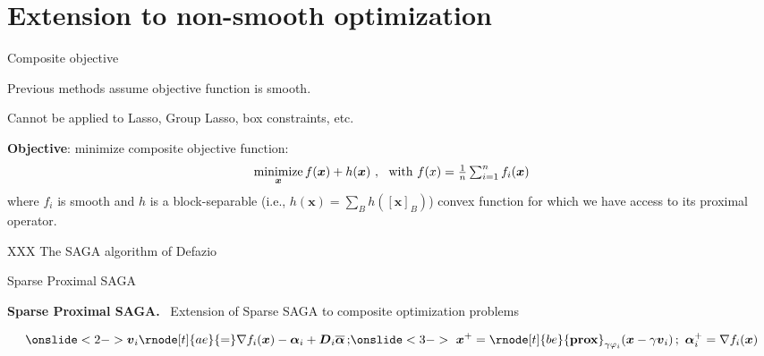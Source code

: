\documentclass[10pt]{beamer}
\let\oldparencite=\parencite
\renewcommand{\parencite}[1]{\textcolor[rgb]{1.,.9,.9}{\oldparencite{#1}}}
\begin{document}
\section{Extension to non-smooth optimization}



\begin{frame}{Composite objective}

Previous methods assume objective function is smooth.

Cannot be applied to Lasso, Group Lasso, box constraints, etc.


\vspace{5mm}
{\bfseries Objective}: minimize composite objective function:
$$
\operatorname*{minimize}_{{\boldsymbol x}} f({\boldsymbol x}) + h({\boldsymbol x})~,~ \text{ with $f(x) = \textstyle \frac{1}{n}\sum_{i=1}^n f_i({\boldsymbol x})$}
$$
where $f_i$ is smooth and $h$ is a block-separable (i.e., $h(\boldsymbol{x}) = \sum_{B} h([\boldsymbol{x}]_B)$) convex function for which we have access to its proximal operator.


XXX The SAGA algorithm of Defazio
\end{frame}



\begin{frame}{Sparse Proximal SAGA}

{\bfseries Sparse Proximal SAGA.}~\parencite{pedregosa2017proxasaga} Extension of Sparse SAGA to composite optimization problems
% 

 

\[
\onslide<2->{
      \vv_i \rnode[t]{ae}{=} \nabla f_i(\xx) - \balpha_i + \boldsymbol{D}_i \overline{\balpha}\,; }
\onslide<3->{%
  ~\xx^+ = \rnode[t]{be}{\prox}_{\gamma \varphi_i}(\xx - \gamma \vv_i)\,;~\balpha_i^+ = \nabla f_i(\xx)}
\] 

 
 
\end{frame}
\end{document}

